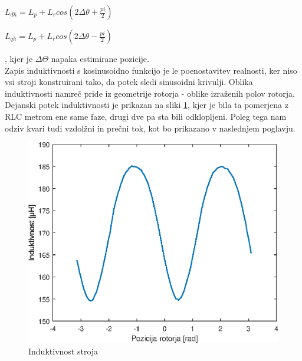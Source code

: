 \documentclass[a4paper,twoside,openright,12pt,slovene]{book}
\begin{document}
\begin{center}
    $L_{dh} = L_p + L_r cos(2\Delta\theta + \frac{pi}{2})$

    $L_{qh} = L_p + L_r cos(2\Delta\theta - \frac{pi}{2})$
\end{center}

, kjer je $\Delta\Theta$ napaka estimirane pozicije.
\\
Zapis induktivnosti s kosinusoidno funkcijo je le poenostavitev realnosti, ker niso vsi stroji konstruirani tako, da potek sledi sinusoidni krivulji. Oblika induktivnosti namreč pride iz geometrije
rotorja - oblike izraženih polov rotorja. Dejanski potek induktivnosti je prikazan na sliki \ref{induktivnostStroja}, kjer je bila ta pomerjena z RLC metrom ene same faze, drugi dve pa sta bili
odklopljeni. Poleg tega nam odziv kvari tudi vzdolžni in prečni tok, kot bo prikazano v naslednjem poglavju.

\begin{figure}[!htbp]
    \centering
    \includegraphics[width=1\columnwidth]{Slike/induktivnostStroja.eps}
    \caption{\label{induktivnostStroja} Induktivnost stroja}
\end{figure}

\end{document}
